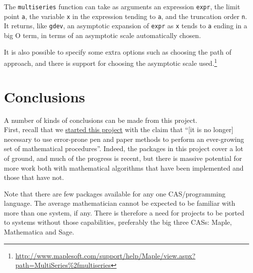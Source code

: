 \documentclass[12pt]{article}
\theoremstyle{plain}
\newcommand{\codefont}[1]{{\fontshape{n}\texttt{#1}}}
\newenvironment{snippet}{\vspace{10px}\fontfamily{ppl}\selectfont}{\vspace{10px}}
\begin{document}
The \texttt{multiseries} function can take as arguments an expression \texttt{expr}, the limit point \texttt{a}, the variable \texttt{x} in the expression tending to \texttt{a}, and the truncation order \texttt{n}.
It returns, like \texttt{gdev}, an asymptotic expansion of \texttt{expr} as \texttt{x} tends to \texttt{a} ending in a big O term, in terms of an asymptotic scale automatically chosen.

It is also possible to specify some extra options such as choosing the path of approach, and there is support for choosing the asymptotic scale used.\footnote{
 \url{http://www.maplesoft.com/support/help/Maple/view.aspx?path=MultiSeries\%2fmultiseries}
}



\section{Conclusions}
\label{sec:conc}
A number of kinds of conclusions can be made from this project.\\

First, recall that we
\hyperlink{started}{started this project}
with the claim that ``[it is no longer] necessary to use error-prone pen and paper methods to perform an ever-growing set of mathematical procedures''.
Indeed, the packages in this project cover a lot of ground, and much of the progress is recent, but there is massive potential for more work both with mathematical algorithms that have been implemented and those that have not.

Note that there are few packages available for any one CAS/programming language.
The average mathematician cannot be expected to be familiar with more than one system, if any.
There is therefore a need for projects to be ported to systems without those capabilities, preferably the big three CASs: Maple, Mathematica and Sage.\\

%
%
\end{document}
